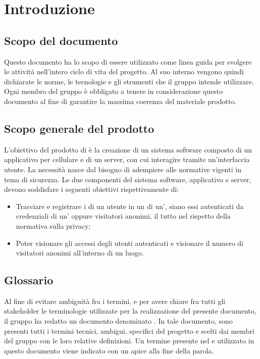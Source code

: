 \section{Introduzione}
\subsection{Scopo del documento}
Questo documento ha lo scopo di essere utilizzato come linea guida per svolgere le attività nell'intero ciclo di vita del progetto.
Al suo interno vengono quindi dichiarate le norme, le tecnologie e gli strumenti che il gruppo \Gruppo{} intende utilizzare.
Ogni membro del gruppo è obbligato a tenere in considerazione questo documento al fine di garantire la massima coerenza del materiale prodotto.
	
\subsection{Scopo generale del prodotto}
L'obiettivo del prodotto \NomeProgetto{} di \Proponente{} è la creazione di un sistema software composto di un applicativo per cellulare e di un server, con cui interagire tramite un'interfaccia utente. La necessità nasce dal bisogno di adempiere alle normative vigenti in tema di sicurezza.
Le due componenti del sistema software, applicativo e server, devono soddisfare i seguenti obiettivi rispettivamente di:
\begin{itemize}
\item Tracciare e registrare i  di un utente in un  di un', siano essi autenticati da credenziali di un' oppure visitatori anonimi, il tutto nel rispetto della normativa sulla privacy;
\item Poter visionare gli accessi degli utenti autenticati e visionare il numero di visitatori anonimi all'interno di un luogo.
\end{itemize}

\subsection{Glossario}
Al fine di evitare ambiguità fra i termini, e per avere chiare fra tutti gli stakeholder le terminologie utilizzate per la realizzazione del presente documento, il gruppo \Gruppo{} ha redatto un documento denominato .
In tale documento, sono presenti tutti i termini tecnici, ambigui, specifici del progetto e scelti dai membri del gruppo con le loro relative definizioni.
Un termine presente nel  e utilizzato in questo documento viene indicato con un apice  alla fine della parola.


